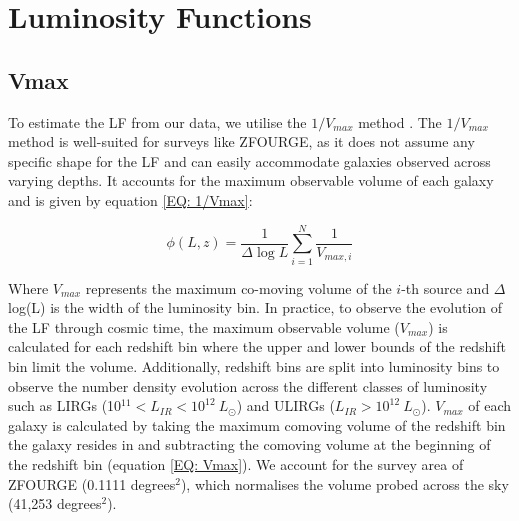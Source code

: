 \section{Luminosity Functions} \label{Sec: Luminosity Functions}
\subsection{Vmax} \label{Sec: Vmax}

To estimate the LF from our data, we utilise the $1/V_{max}$ method \citep{schmidt_space_1968}. The $1/V_{max}$ method is well-suited for surveys like ZFOURGE, as it does not assume any specific shape for the LF and can easily accommodate galaxies observed across varying depths. It accounts for the maximum observable volume of each galaxy and is given by equation \ref{EQ: 1/Vmax}:

\begin{equation} \label{EQ: 1/Vmax}
    \phi(L,z) = \frac{1}{\Delta \log L}\sum_{i=1}^N \frac{1}{V_{max,i}}
\end{equation}

Where $V_{max}$ represents the maximum co-moving volume of the $i$-th source and $\Delta$ log(L) is the width of the luminosity bin. In practice, to observe the evolution of the LF through cosmic time, the maximum observable volume ($V_{max}$) is calculated for each redshift bin where the upper and lower bounds of the redshift bin limit the volume. Additionally, redshift bins are split into luminosity bins to observe the number density evolution across the different classes of luminosity such as LIRGs (10$^{11} < L_{IR} < 10^{12}\ L_{\odot}$) and ULIRGs ($L_{IR} > 10^{12}\ L_{\odot}$). $V_{max}$ of each galaxy is calculated by taking the maximum comoving volume of the redshift bin the galaxy resides in and subtracting the comoving volume at the beginning of the redshift bin (equation \ref{EQ: Vmax}). We account for the survey area of ZFOURGE (0.1111 degrees$^2$), which normalises the volume probed across the sky (41,253 degrees$^2$). 

